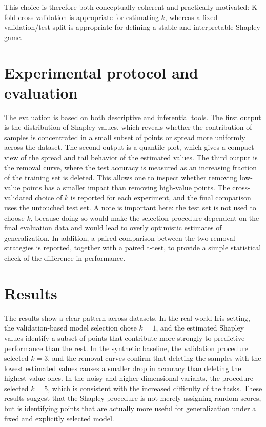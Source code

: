 \documentclass[11pt]{article}
\begin{document}
This choice is therefore both conceptually coherent and practically motivated: K-fold cross-validation is appropriate for estimating $k$, whereas a fixed validation/test split is appropriate for defining a stable and interpretable Shapley game.

\section{Experimental protocol and evaluation}
The evaluation is based on both descriptive and inferential tools. The first output is the distribution of Shapley values, which reveals whether the contribution of samples is concentrated in a small subset of points or spread more uniformly across the dataset. The second output is a quantile plot, which gives a compact view of the spread and tail behavior of the estimated values. The third output is the removal curve, where the test accuracy is measured as an increasing fraction of the training set is deleted. This allows one to inspect whether removing low-value points has a smaller impact than removing high-value points. The cross-validated choice of $k$ is reported for each experiment, and the final comparison uses the untouched test set. A note is important here: the test set is not used to choose $k$, because doing so would make the selection procedure dependent on the final evaluation data and would lead to overly optimistic estimates of generalization. In addition, a paired comparison between the two removal strategies is reported, together with a paired t-test, to provide a simple statistical check of the difference in performance.

\section{Results}
The results show a clear pattern across datasets. In the real-world Iris setting, the validation-based model selection chose $k=1$, and the estimated Shapley values identify a subset of points that contribute more strongly to predictive performance than the rest. In the synthetic baseline, the validation procedure selected $k=3$, and the removal curves confirm that deleting the samples with the lowest estimated values causes a smaller drop in accuracy than deleting the highest-value ones. In the noisy and higher-dimensional variants, the procedure selected $k=5$, which is consistent with the increased difficulty of the tasks. These results suggest that the Shapley procedure is not merely assigning random scores, but is identifying points that are actually more useful for generalization under a fixed and explicitly selected model.
\end{document}
